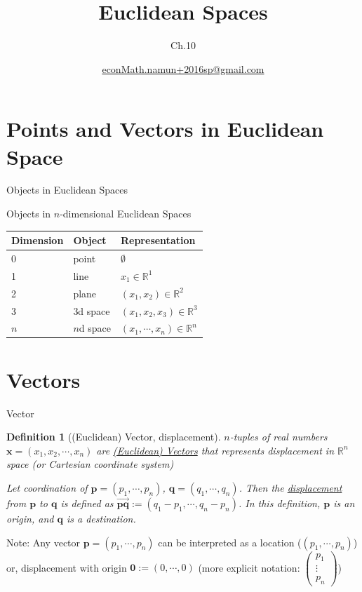 \documentclass[a4paper,11pt]{article}
\author[조남운]{\url{econMath.namun+2016sp@gmail.com}}
\title{Euclidean Spaces}
\subtitle{Ch.10}
\newtheorem{defn}{Definition}
\begin{document}
	
\maketitle


\section{Points and Vectors in Euclidean Space} %
\label{sec:points_and_vectors_in_euclidean_space}
\begin{frame}[t]{Objects in Euclidean Spaces}
\begin{block}
	{Objects in $n$-dimensional Euclidean Spaces}
	\begin{tabular}
		{lll}
		Dimension & Object & Representation\\
		\hline\hline
		0 & point & $\emptyset$\\
		1 & line & $x_1\in \mathbb{R}^1$\\
		2 & plane & $(x_1,x_2)\in \mathbb{R}^2$\\
		3 & 3d space & $(x_1,x_2,x_3)\in \mathbb{R}^3$\\
		$n$ & $n$d space  & $(x_1,\cdots,x_n)\in\mathbb{R}^n$
	\end{tabular}
\end{block}
\end{frame}

\section{Vectors} %
\label{sec:vectors}

\begin{frame}[t]{Vector}
	\begin{defn}
		[(Euclidean) Vector, displacement]
		$n$-tuples of real numbers $\mathbf{x}=(x_1,x_2,\cdots,x_n)$ are \uline{(Euclidean) Vectors} that represents displacement in $\mathbb{R}^n$  space (or Cartesian coordinate system)
		
		Let coordination of $\mathbf{p}=(p_1,\cdots,p_n)$, $\mathbf{q}=(q_1,\cdots,q_n)$. Then the \uline{displacement} from $\mathbf{p}$ to $\mathbf{q}$ is defined as $\overrightarrow{\mathbf{pq}}:=(q_1-p_1,\cdots,q_n-p_n)$. In this definition, $\mathbf{p}$ is an origin, and $\mathbf{q}$ is a destination. 
	\end{defn}
	Note: Any vector $\mathbf{p}=(p_1,\cdots,p_n)$ can be interpreted as a location ($(p_1,\cdots,p_n)$) or, displacement with origin $\mathbf{0}:=(0,\cdots,0)$ (more explicit notation: $\begin{pmatrix}
		p_1 \\
		\vdots\\
		p_n
	\end{pmatrix}$)
\end{frame}
\end{document}
